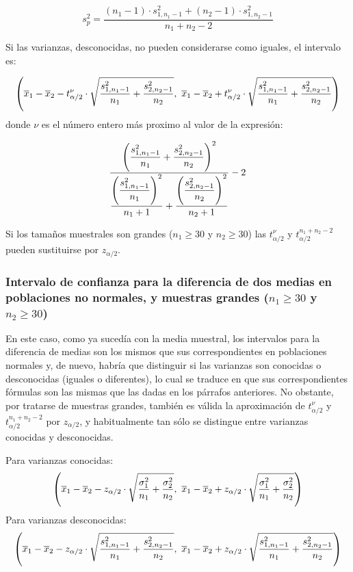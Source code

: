 \documentclass[a4paper]{article}
\begin{document}
\[
s_{p}^{2}=\dfrac{\left( n_{1}-1\right) \cdot
s_{1,n_{1}-1}^{2}+\left( n_{2}-1\right) \cdot
s_{1,n_{2}-1}^{2}}{n_{1}+n_{2}-2}
\]

Si las varianzas, desconocidas, no pueden considerarse como
iguales, el intervalo es:

\[
\left( \overline{x}_{1}-\overline{x}_{2}-t_{\alpha /2}^{\nu }\cdot \sqrt{%
\dfrac{s_{1,n_{1}-1}^{2}}{n_{1}}+\dfrac{s_{2,n_{2}-1}^{2}}{n_{2}}},\
\overline{x}_{1}-\overline{x}_{2}+t_{\alpha /2}^{\nu }\cdot \sqrt{\dfrac{%
s_{1,n_{1}-1}^{2}}{n_{1}}+\dfrac{s_{2,n_{2}-1}^{2}}{n_{2}}}\right)
\]
donde $\nu$ es el número entero más proximo al valor de la
expresión:

\[
\dfrac{\left( \dfrac{s_{1,n_{1}-1}^{2}}{n_{1}}+\dfrac{s_{2,n_{2}-1}^{2}}{%
n_{2}}\right) ^{2}}{\dfrac{\left(
\dfrac{s_{1,n_{1}-1}^{2}}{n_{1}}\right)
^{2}}{n_{1}+1}+\dfrac{\left( \dfrac{s_{2,n_{2}-1}^{2}}{n_{2}}\right) ^{2}}{%
n_{2}+1}}-2
\]

Si los tamaños muestrales son grandes ($n_{1}\geq30$ y
$n_{2}\geq30$) las $t_{\alpha /2}^{\nu}$ y $t_{\alpha
/2}^{n_{1}+n_{2}-2}$ pueden sustituirse por $z_{\alpha/2}$.

\subsubsection* {Intervalo de confianza para la diferencia de dos
medias en poblaciones no normales, y muestras grandes
($n_{1}\geq30$ y $n_{2}\geq30$)}


En este caso, como ya sucedía con la media muestral, los
intervalos para la diferencia de medias son los mismos que sus
correspondientes en poblaciones normales y, de nuevo, habría que
distinguir si las varianzas son conocidas o desconocidas (iguales
o diferentes), lo cual se traduce en que sus correspondientes
fórmulas son las mismas que las dadas en los párrafos anteriores.
No obstante, por tratarse de muestras grandes, también es válida
la aproximación de $t_{\alpha /2}^{\nu}$ y $t_{\alpha
/2}^{n_{1}+n_{2}-2}$ por $z_{\alpha/2}$, y habitualmente tan sólo
se distingue entre varianzas conocidas y desconocidas.

Para varianzas conocidas:
\[
\left( \overline{x}_{1}-\overline{x}_{2}-z_{\alpha /2}\cdot \sqrt{\dfrac{%
\sigma _{1}^{2}}{n_{1}}+\dfrac{\sigma _{2}^{2}}{n_{2}}},\ \overline{x}_{1}-%
\overline{x}_{2}+z_{\alpha /2}\cdot \sqrt{\dfrac{\sigma _{1}^{2}}{n_{1}}+%
\dfrac{\sigma _{2}^{2}}{n_{2}}}\right)
\]
Para varianzas desconocidas:
\[
\left( \overline{x}_{1}-\overline{x}_{2}-z_{\alpha /2}\cdot \sqrt{%
\dfrac{s_{1,n_{1}-1}^{2}}{n_{1}}+\dfrac{s_{2,n_{2}-1}^{2}}{n_{2}}},\
\overline{x}_{1}-\overline{x}_{2}+z_{\alpha /2}\cdot \sqrt{\dfrac{%
s_{1,n_{1}-1}^{2}}{n_{1}}+\dfrac{s_{2,n_{2}-1}^{2}}{n_{2}}}\right)
\]
\end{document}
